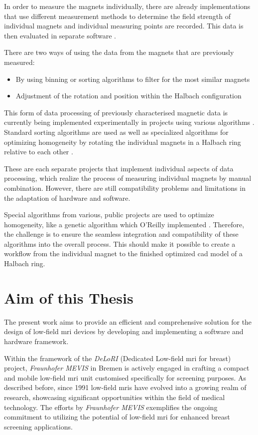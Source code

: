 In order to measure the magnets individually, there are already
implementations that use different measurement methods to determine the
field strength of individual magnets and individual measuring points are
recorded. This data is then evaluated in separate software
.

There are two ways of using the data from the magnets that are
previously measured:

\begin{itemize}
\tightlist
\item
  By using binning or sorting algorithms to filter for the most similar
  magnets
\item
  Adjustment of the rotation and position within the Halbach
  configuration
\end{itemize}

This form of data processing of previously characterised magnetic data
is currently being implemented experimentally in projects using various
algorithms . Standard sorting algorithms are used as
well as specialized algorithms for optimizing homogeneity by rotating
the individual magnets in a Halbach ring relative to each other
.

These are each separate projects that implement individual aspects of
data processing, which realize the process of measuring individual
magnets by manual combination. However, there are still compatibility
problems and limitations in the adaptation of hardware and software.

Special algorithms from various, public projects are used to optimize
homogeneity, like a genetic algorithm which O'Reilly implemented
. Therefore, the challenge is to ensure the seamless
integration and compatibility of these algorithms into the overall
process. This should make it possible to create a workflow from the
individual magnet to the finished optimized \gls{cad} model of a Halbach
ring.

\hypertarget{aim-of-this-thesis}{%
\section{Aim of this Thesis}\label{aim-of-this-thesis}}

The present work aims to provide an efficient and comprehensive solution
for the design of low-field \gls{mri} devices by developing and
implementing a software and hardware framework.

Within the framework of the \emph{DeLoRI} (Dedicated Low-field \gls{mri}
for breast) project, \emph{Fraunhofer MEVIS} in Bremen is actively
engaged in crafting a compact and mobile low-field \gls{mri} unit
customised specifically for screening purposes. As described before,
since 1991 low-field \gls{mri}s have evolved into a growing realm of
research, showcasing significant opportunities within the field of
medical technology. The efforts by \emph{Fraunhofer MEVIS} exemplifies
the ongoing commitment to utilizing the potential of low-field \gls{mri}
for enhanced breast screening applications.

